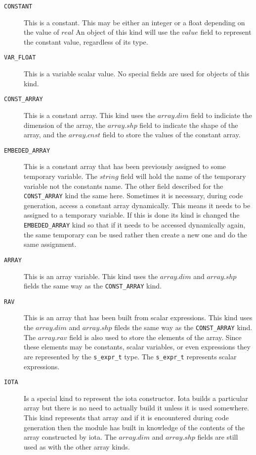 \begin{description}
\item[{\tt CONSTANT}] This is a constant.
This may be either an integer or a float depending on the value of $real$
An object of this kind will use the $value$ field
to represent the constant value, regardless of its type.

\item[{\tt VAR\_FLOAT}] This is a variable scalar value.  No special fields
are used for objects of this kind.

\item[{\tt CONST\_ARRAY}] This is a constant array.  This kind uses the
$array.dim$
field to indiciate the dimension of the array, the $array.shp$ field to 
indicate the shape of the array, and the $array.cnst$ field to store the
values of the constant array.

\item[{\tt EMBEDED\_ARRAY}] This is a constant array that has been previously 
assigned to some temporary variable.  The $string$ field will hold the name
of the temporary variable not the constants name.  The other field described
for the {\tt CONST\_ARRAY} kind the same here.  Sometimes it is necessary, during
code generation, access a constant array dynamically.  This means it needs
to be assigned to a temporary variable.  If this is done its kind is changed
the {\tt EMBEDED\_ARRAY} kind so that if it needs to be accessed dynamically again,
the same temporary can be used rather then create a new one and do the same
assignment.

\item[{\tt ARRAY}] This is an array variable.  This kind uses the $array.dim$ and
$array.shp$ fields the same way as the {\tt CONST\_ARRAY} kind.

\item[{\tt RAV}] This is an array that has been built from scalar expressions.  This 
kind uses the $array.dim$ and $array.shp$ fileds the same way as the
{\tt CONST\_ARRAY} kind.
The $array.rav$ field is also used to store the elements of the array.  Since
these elements may be constants, scalar variables, or even expressions they
are represented by the {\tt s\_expr\_t} type.  The {\tt s\_expr\_t} represents scalar
expressions.

\item[{\tt IOTA}] Is a special kind to represent the iota constructor.  Iota builds
a particular array but there is no need to actually build it unless it is
used somewhere.  This kind represents that array and if it is encountered 
during code generation then the module has built in knowledge of the contents
of the array constructed by iota.  The $array.dim$ and $array.shp$ fields are
still used as with the other array kinds.
\end{description}

